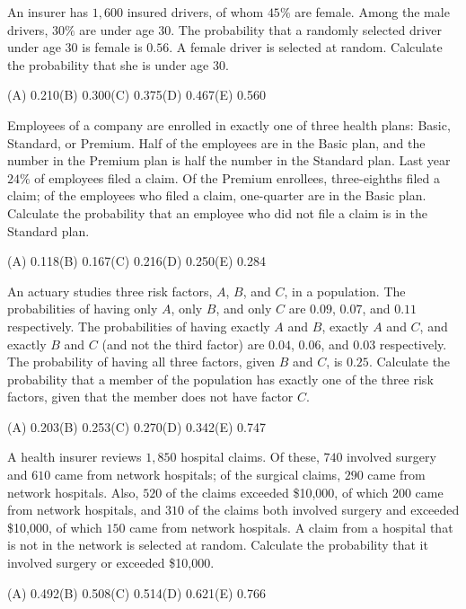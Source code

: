 \begin{practice}
An insurer has $1{,}600$ insured drivers, of whom $45\%$ are female. Among
the male drivers, $30\%$ are under age $30$. The probability that a randomly
selected driver under age $30$ is female is $0.56$. A female driver is
selected at random. Calculate the probability that she is under age $30$.

\medskip
(A) 0.210\qquad (B) 0.300\qquad (C) 0.375\qquad (D) 0.467\qquad (E) 0.560
\end{practice}

\begin{practice}
Employees of a company are enrolled in exactly one of three health plans:
Basic, Standard, or Premium. Half of the employees are in the Basic plan, and
the number in the Premium plan is half the number in the Standard plan. Last
year $24\%$ of employees filed a claim. Of the Premium enrollees, three-eighths
filed a claim; of the employees who filed a claim, one-quarter are in the Basic
plan. Calculate the probability that an employee who did not file a claim is in
the Standard plan.

\medskip
(A) 0.118\qquad (B) 0.167\qquad (C) 0.216\qquad (D) 0.250\qquad (E) 0.284
\end{practice}

\begin{practice}
An actuary studies three risk factors, $A$, $B$, and $C$, in a population.
The probabilities of having only $A$, only $B$, and only $C$ are $0.09$,
$0.07$, and $0.11$ respectively. The probabilities of having exactly $A$ and
$B$, exactly $A$ and $C$, and exactly $B$ and $C$ (and not the third factor)
are $0.04$, $0.06$, and $0.03$ respectively. The probability of having all
three factors, given $B$ and $C$, is $0.25$. Calculate the probability that a
member of the population has exactly one of the three risk factors, given that
the member does not have factor $C$.

\medskip
(A) 0.203\qquad (B) 0.253\qquad (C) 0.270\qquad (D) 0.342\qquad (E) 0.747
\end{practice}

\begin{practice}
A health insurer reviews $1{,}850$ hospital claims. Of these, $740$ involved
surgery and $610$ came from network hospitals; of the surgical claims, $290$
came from network hospitals. Also, $520$ of the claims exceeded \$10{,}000, of
which $200$ came from network hospitals, and $310$ of the claims both involved
surgery and exceeded \$10{,}000, of which $150$ came from network hospitals. A
claim from a hospital that is not in the network is selected at random.
Calculate the probability that it involved surgery or exceeded \$10{,}000.

\medskip
(A) 0.492\qquad (B) 0.508\qquad (C) 0.514\qquad (D) 0.621\qquad (E) 0.766
\end{practice}

